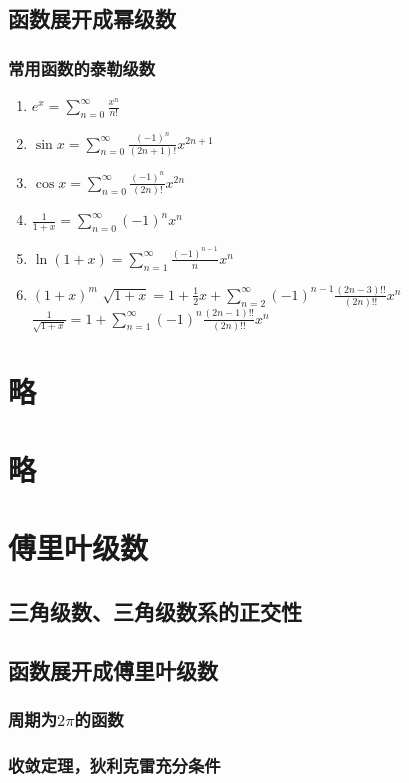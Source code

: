 \documentclass[UTF8,a4paper,12pt,scheme=chinese]{ctexbook}
\theoremstyle{plain}
\begin{document}
	\subsection{函数展开成幂级数}
	\subsubsection{常用函数的泰勒级数}
	\begin{enumerate}
		\item $\displaystyle
		e^x=\sum_{n=0}^{\infty}\frac{x^n}{n!}$
		\item $\displaystyle
		\sin x = \sum_{n=0}^{\infty}\frac{(-1)^n}{(2n+1)!}x^{2n+1}$
		\item $\displaystyle
		\cos x = \sum_{n=0}^{\infty}\frac{(-1)^n}{(2n)!}x^{2n}$
		\item $\displaystyle
		\frac{1}{1+x} = \sum_{n=0}^{\infty}(-1)^nx^n$
		\item $\displaystyle
		\ln(1+x) = \sum_{n=1}^{\infty}\frac{(-1)^{n-1}}{n}x^n$
		\item $(1+x)^m$
		\subitem $\displaystyle\sqrt{1+x} = 1 + \frac{1}{2}x + \sum_{n=2}^{\infty}(-1)^{n-1}\frac{(2n-3)!!}{(2n)!!}x^n$
		\subitem $\displaystyle
		\frac{1}{\sqrt{1+x}} = 1 + \sum_{n=1}^{\infty}(-1)^{n}\frac{(2n-1)!!}{(2n)!!}x^n$
	\end{enumerate}
	\section{略}
	\section{略}
	\section{傅里叶级数}
	\subsection{三角级数、三角级数系的正交性}
	\subsection{函数展开成傅里叶级数}
	\subsubsection{周期为$2\pi$的函数}
	\subsubsection{收敛定理，狄利克雷充分条件}
\end{document}
